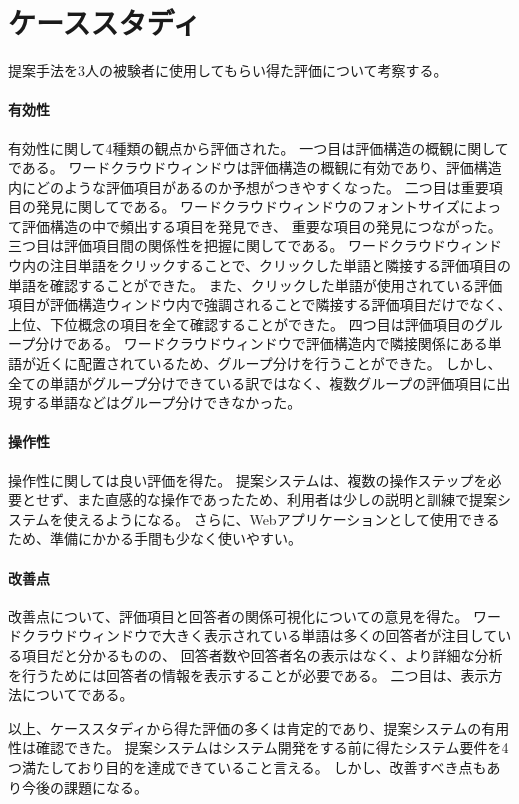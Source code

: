 \documentclass[syuuron]{kuee}
\begin{document}
	\section{ケーススタディ}%
	提案手法を3人の被験者に使用してもらい得た評価について考察する。
		\paragraph{有効性}
		有効性に関して4種類の観点から評価された。
		一つ目は評価構造の概観に関してである。
		ワードクラウドウィンドウは評価構造の概観に有効であり、評価構造内にどのような評価項目があるのか予想がつきやすくなった。
		二つ目は重要項目の発見に関してである。
		ワードクラウドウィンドウのフォントサイズによって評価構造の中で頻出する項目を発見でき、
		重要な項目の発見につながった。
		三つ目は評価項目間の関係性を把握に関してである。
		ワードクラウドウィンドウ内の注目単語をクリックすることで、クリックした単語と隣接する評価項目の単語を確認することができた。
		また、クリックした単語が使用されている評価項目が評価構造ウィンドウ内で強調されることで隣接する評価項目だけでなく、
		上位、下位概念の項目を全て確認することができた。
		四つ目は評価項目のグループ分けである。
		ワードクラウドウィンドウで評価構造内で隣接関係にある単語が近くに配置されているため、グループ分けを行うことができた。
		しかし、全ての単語がグループ分けできている訳ではなく、複数グループの評価項目に出現する単語などはグループ分けできなかった。
		
		\paragraph{操作性}
		操作性に関しては良い評価を得た。
		提案システムは、複数の操作ステップを必要とせず、また直感的な操作であったため、利用者は少しの説明と訓練で提案システムを使えるようになる。
		さらに、Webアプリケーションとして使用できるため、準備にかかる手間も少なく使いやすい。
		
		\paragraph{改善点}
		改善点について、評価項目と回答者の関係可視化についての意見を得た。
		ワードクラウドウィンドウで大きく表示されている単語は多くの回答者が注目している項目だと分かるものの、
		回答者数や回答者名の表示はなく、より詳細な分析を行うためには回答者の情報を表示することが必要である。
		二つ目は、表示方法についてである。
		
		以上、ケーススタディから得た評価の多くは肯定的であり、提案システムの有用性は確認できた。
		提案システムはシステム開発をする前に得たシステム要件を4つ満たしており目的を達成できていること言える。
		しかし、改善すべき点もあり今後の課題になる。
		
\end{document}
